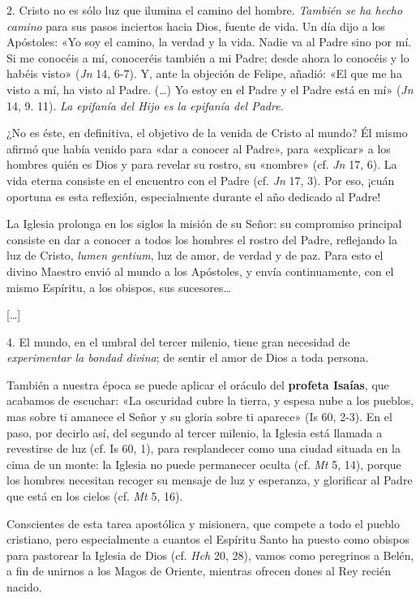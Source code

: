 \documentclass[]{article}
\begin{document}
2. Cristo no es sólo luz que ilumina el camino del hombre. \emph{También
se ha hecho camino} para sus pasos inciertos hacia Dios, fuente de vida.
Un día dijo a los Apóstoles: «Yo soy el camino, la verdad y la vida.
Nadie va al Padre sino por mí. Si me conocéis a mí, conoceréis también a
mi Padre; desde ahora lo conocéis y lo habéis visto» (\emph{Jn} 14,
6-7). Y, ante la objeción de Felipe, añadió: «El que me ha visto a mí,
ha visto al Padre. (\ldots{}) Yo estoy en el Padre y el Padre está en
mí» (\emph{Jn} 14, 9. 11). \emph{La epifanía del Hijo es la epifanía del
Padre}.

¿No es éste, en definitiva, el objetivo de la venida de Cristo al mundo?
Él mismo afirmó que había venido para «dar a conocer al Padre», para
«explicar» a los hombres quién es Dios y para revelar su rostro, su
«nombre» (cf. \emph{Jn} 17, 6). La vida eterna consiste en el encuentro
con el Padre (cf. \emph{Jn} 17, 3). Por eso, ¡cuán oportuna es esta
reflexión, especialmente durante el año dedicado al Padre!

La Iglesia prolonga en los siglos la misión de su Señor: su compromiso
principal consiste en dar a conocer a todos los hombres el rostro del
Padre, reflejando la luz de Cristo, \emph{lumen gentium}, luz de amor,
de verdad y de paz. Para esto el divino Maestro envió al mundo a los
Apóstoles, y envía continuamente, con el mismo Espíritu, a los obispos,
sus sucesores\ldots{}

{[}\ldots{}{]}

4. El mundo, en el umbral del tercer milenio, tiene gran necesidad de
\emph{experimentar la bondad divina}; de sentir el amor de Dios a toda
persona.

También a nuestra época se puede aplicar el oráculo del \textbf{profeta
Isaías}, que acabamos de escuchar: «La oscuridad cubre la tierra, y
espesa nube a los pueblos, mas sobre ti amanece el Señor y su gloria
sobre ti aparece» (Is 60, 2-3). En el paso, por decirlo así, del segundo
al tercer milenio, la Iglesia está llamada a revestirse de luz (cf. Is
60, 1), para resplandecer como una ciudad situada en la cima de un
monte: la Iglesia no puede permanecer oculta (cf. \emph{Mt} 5, 14),
porque los hombres necesitan recoger su mensaje de luz y esperanza, y
glorificar al Padre que está en los cielos (cf. \emph{Mt} 5, 16).

Conscientes de esta tarea apostólica y misionera, que compete a todo el
pueblo cristiano, pero especialmente a cuantos el Espíritu Santo ha
puesto como obispos para pastorear la Iglesia de Dios (cf. \emph{Hch}
20, 28), vamos como peregrinos a Belén, a fin de unirnos a los Magos de
Oriente, mientras ofrecen dones al Rey recién nacido.
\end{document}
